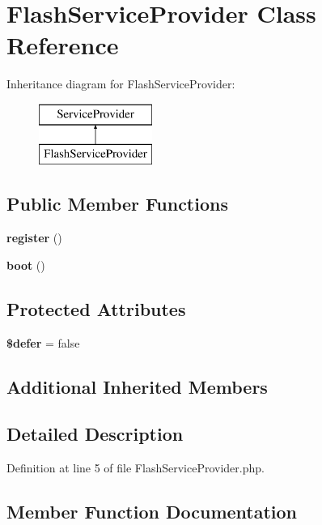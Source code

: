 \section{Flash\+Service\+Provider Class Reference}
\label{class_laracasts_1_1_flash_1_1_flash_service_provider}
Inheritance diagram for Flash\+Service\+Provider\+:\begin{figure}[H]
\begin{center}
\leavevmode
\includegraphics[height=2.000000cm]{class_laracasts_1_1_flash_1_1_flash_service_provider}
\end{center}
\end{figure}
\subsection*{Public Member Functions}
\begin{DoxyCompactItemize}
\item 
{\bf register} ()
\item 
{\bf boot} ()
\end{DoxyCompactItemize}
\subsection*{Protected Attributes}
\begin{DoxyCompactItemize}
\item 
{\bf \$defer} = false
\end{DoxyCompactItemize}
\subsection*{Additional Inherited Members}


\subsection{Detailed Description}


Definition at line 5 of file Flash\+Service\+Provider.\+php.



\subsection{Member Function Documentation}
